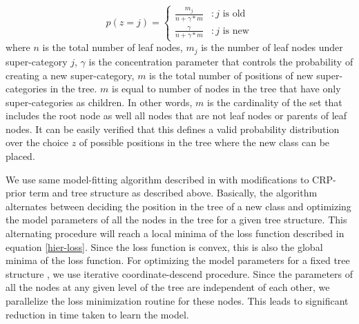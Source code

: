 \documentclass[10pt,twocolumn,letterpaper]{article}
\begin{document}
 \begin{displaymath}
 p(z=j) = \left \{
	    \begin{array}{lr}
 		\frac{m_{j}}{n+\gamma*m} & : \text{$j$ is old} \\
		\frac{\gamma}{n+\gamma*m} & : \text{$j$ is new}
	   \end{array}
	  \right.
 \end{displaymath}  
where $n$ is the total number of leaf nodes, $m_{j}$
is the number of leaf nodes under super-category $j$,
$\gamma$ is the concentration parameter that controls the probability of creating a new super-category,
$m$ is the total number of positions of new super-categories in the tree. $m$ is equal to number of nodes
in the tree that have only super-categories as children. In other words, $m$ is the cardinality of the set that 
includes the root node as well all nodes that are not leaf nodes or parents of leaf nodes. It can be easily verified that 
this defines a valid probability distribution over the choice $z$ of possible positions in the tree where the new class can be placed.

We use same model-fitting algorithm described in \cite{ruslan} with modifications to CRP-prior term and tree structure as described above.
Basically, the algorithm alternates between deciding the position in the tree of a new class and optimizing the model parameters of all the nodes
in the tree for a given tree structure.  This alternating procedure will reach a local minima of the loss function 
described in equation \ref{hier-loss}. Since the loss function is convex, this is also the global minima of the loss function. 
For optimizing the model parameters for a fixed tree structure , we use iterative coordinate-descend procedure.
Since the parameters of all the nodes at any given level of the tree are independent of each other, we parallelize the loss minimization 
routine for these nodes. This leads to significant reduction in time taken to learn the model.
\end{document}
